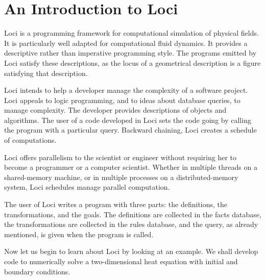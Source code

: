 \chapter{An Introduction to Loci}

Loci is a programming framework for computational simulation of
physical fields.  It is particularly well adapted for computational
fluid dynamics.  It provides a descriptive rather than imperative
programming style.  The programs emitted by Loci satisfy these
descriptions, as the locus of a geometrical description is a figure
satisfying that description.

Loci intends to help a developer manage the complexity of a software
project.  Loci appeals to logic programming, and to ideas about
database queries, to manage complexity.  The developer provides
descriptions of objects and algorithms.  The user of a code developed
in Loci sets the code going by calling the program with a particular
query.  Backward chaining, Loci creates a schedule of computations.

Loci offers parallelism to the scientist or engineer without requiring
her to become a programmer or a computer scientist.  Whether in
multiple threads on a shared-memory machine, or in multiple processes
on a distributed-memory system, Loci schedules manage parallel
computation.

The user of Loci writes a program with three parts:  the definitions,
the transformations, and the goals.  The definitions are collected in
the facts database, the transformations are collected in the rules
database, and the query, as already mentioned, is given when the
program is called.

Now let us begin to learn about Loci by looking at an example.  We
shall develop code to numerically solve a two-dimensional heat
equation with initial and boundary conditions.
